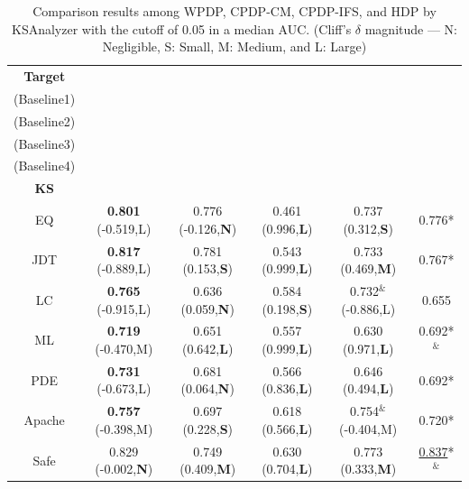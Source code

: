 \begin{table}[!t]
\centering
\caption{Comparison results among WPDP, CPDP-CM, CPDP-IFS,
and HDP by KSAnalyzer with the cutoff of 0.05 in a median AUC. (Cliff's $\delta$ magnitude --- N: Negligible, S: Small, M: Medium, and L: Large)
}
\label{tab:result_overview}
\begin{tabular}{|c||c|c|c|c||c|}
\hline
{\bf Target}
& \specialcell{{\bf WPDP}\\{(Baseline1)}}
&\specialcell{{\bf CPDP-CM}\\{(Baseline2)}}
&\specialcell{{\bf CPDP-IFS}\\{(Baseline3)}}
&\specialcell{{\bf UDP}\\{(Baseline4)}}
&\specialcell{{\bf HDP}\\{\bf KS}}%
\\
\hline \hline
EQ  &{\bf 0.801} (-0.519,L) &0.776 (-0.126,{\bf N}) &0.461 (0.996,{\bf L})  &0.737 (0.312,{\bf S})  &0.776* \\ \hline
    JDT &{\bf 0.817} (-0.889,L) &0.781 (0.153,{\bf S})  &0.543 (0.999,{\bf L})  &0.733 (0.469,{\bf M})  &0.767* \\ \hline
    LC  &{\bf 0.765} (-0.915,L) &0.636 (0.059,{\bf N})  &0.584 (0.198,{\bf S})  &0.732$^{\&}$ (-0.886,L)        &0.655 \\ \hline
    ML  &{\bf 0.719} (-0.470,M) &0.651 (0.642,{\bf L})  &0.557 (0.999,{\bf L})  &0.630 (0.971,{\bf L})  &0.692*$^{\&}$ \\ \hline
    PDE &{\bf 0.731} (-0.673,L) &0.681 (0.064,{\bf N})  &0.566 (0.836,{\bf L})  &0.646 (0.494,{\bf L})  &0.692* \\ \hline
    Apache      &{\bf 0.757} (-0.398,M) &0.697 (0.228,{\bf S})  &0.618 (0.566,{\bf L})  &0.754$^{\&}$ (-0.404,M)        &0.720* \\ \hline
    Safe        &0.829 (-0.002,{\bf N}) &0.749 (0.409,{\bf M})  &0.630 (0.704,{\bf L})  &0.773 (0.333,{\bf M})  &\underline{0.837}*$^{\&}$ \\ \hline

\end{tabular}
\end{table}
